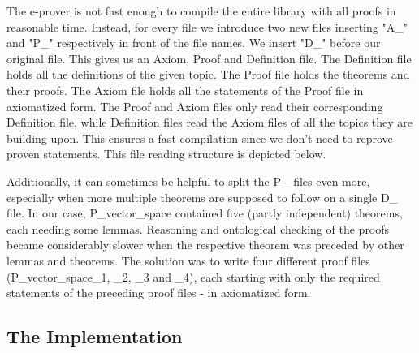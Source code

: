 \documentclass[11pt]{article}
\begin{document}
The e-prover is not fast enough to compile the entire library with all proofs in reasonable time. 
Instead, for every file we introduce two new files inserting "A\_" and "P\_" respectively in front of the file names. We insert "D\_" before our original file. This gives us an Axiom, Proof and Definition file. 
The Definition file holds all the definitions of the given topic. 
The Proof file holds the theorems and their proofs. The Axiom file holds all the statements of the Proof file in axiomatized form. 
The Proof and Axiom files only read their corresponding Definition file, while Definition files read the Axiom files of all the topics they are building upon. 
This ensures a fast compilation since we don't need to reprove proven statements. 
This file reading structure is depicted below.

\begin{figure}[h]
\begin{center}
\end{center}
\end{figure}

Additionally, it can sometimes be helpful to split the P\_ files even more, especially when more multiple theorems are supposed to follow on a single D\_ file. In our case, P\_vector\_space contained five (partly independent) theorems, each needing some lemmas. Reasoning and ontological checking of the proofs became considerably slower when the respective theorem was preceded by other lemmas and theorems. The solution was to write four different proof files (P\_vector\_space\_1, \_2, \_3 and \_4), each starting with only the required statements of the preceding proof files - in axiomatized form.


\subsection{The Implementation}
\end{document}
